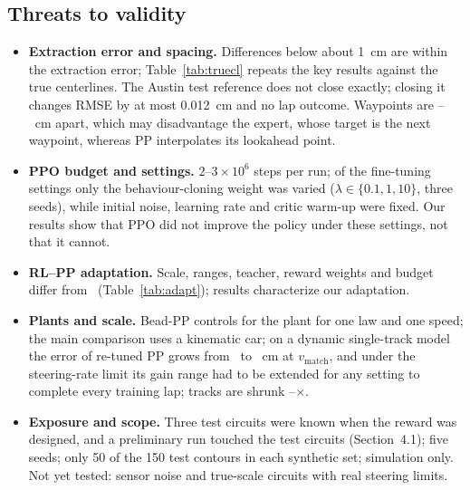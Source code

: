 \documentclass{IJCAS}
\begin{document}
\subsection{Threats to validity}
\begin{itemize}
\item \textbf{Extraction error and spacing.} Differences below about 1~cm are within the extraction error; Table~\ref{tab:truecl} repeats the key results against the true centerlines. The Austin test reference does not close exactly; closing it changes RMSE by at most 0.012~cm and no lap outcome. Waypoints are \VspMin--\VspMax~cm apart, which may disadvantage the expert, whose target is the next waypoint, whereas PP interpolates its lookahead point.
\item \textbf{PPO budget and settings.} $2$--$3\times10^6$ steps per run; of the fine-tuning settings only the behaviour-cloning weight was varied ($\lambda\in\{0.1,1,10\}$, three seeds), while initial noise, learning rate and critic warm-up were fixed. Our results show that PPO did not improve the policy under these settings, not that it cannot.
\item \textbf{RL--PP adaptation.} Scale, ranges, teacher, reward weights and budget differ from~\cite{elgouhary2026} (Table~\ref{tab:adapt}); results characterize our adaptation.
\item \textbf{Plants and scale.} Bead-PP controls for the plant for one law and one speed; the main comparison uses a kinematic car; on a dynamic single-track model the error of re-tuned PP grows from \VrmseFixM\ to \VrmseDtFixH~cm at $v_{\mathrm{match}}$, and under the steering-rate limit its gain range had to be extended for any setting to complete every training lap; tracks are shrunk \VscaleLo--\VscaleHi$\times$.
\item \textbf{Exposure and scope.} Three test circuits were known when the reward was designed, and a preliminary run touched the test circuits (Section~4.1); five seeds; only 50 of the 150 test contours in each synthetic set; simulation only. Not yet tested: sensor noise and true-scale circuits with real steering limits.
\end{itemize}
\end{document}
